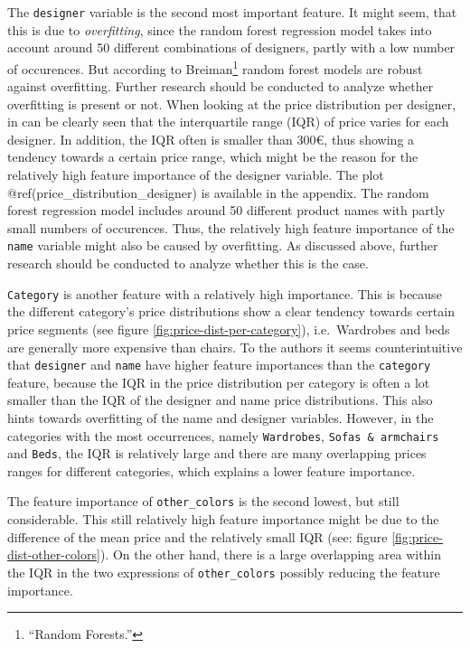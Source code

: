 \documentclass[a4paper, nobind]{templates/ociamthesis}
\begin{document}
The \texttt{designer} variable is the second most important feature. It might seem, that this is due to \emph{overfitting}, since the random forest regression model takes into account around 50 different combinations of designers, partly with a low number of occurences. But according to Breiman\footnote{``Random Forests.''} random forest models are robust against overfitting. Further research should be conducted to analyze whether overfitting is present or not.
When looking at the price distribution per designer, in can be clearly seen that the interquartile range (IQR) of price varies for each designer. In addition, the IQR often is smaller than 300€, thus showing a tendency towards a certain price range, which might be the reason for the relatively high feature importance of the designer variable. The plot @ref(price\_distribution\_designer) is available in the appendix.
The random forest regression model includes around 50 different product names with partly small numbers of occurences. Thus, the relatively high feature importance of the \texttt{name} variable might also be caused by overfitting. As discussed above, further research should be conducted to analyze whether this is the case.

\texttt{Category} is another feature with a relatively high importance. This is because the different category's price distributions show a clear tendency towards certain price segments (see figure \ref{fig:price-dist-per-category}), i.e.~Wardrobes and beds are generally more expensive than chairs.
To the authors it seems counterintuitive that \texttt{designer} and \texttt{name} have higher feature importances than the \texttt{category} feature, because the IQR in the price distribution per category is often a lot smaller than the IQR of the designer and name price distributions. This also hints towards overfitting of the name and designer variables. However, in the categories with the most occurrences, namely \texttt{Wardrobes}, \texttt{Sofas\ \&\ armchairs} and \texttt{Beds}, the IQR is relatively large and there are many overlapping prices ranges for different categories, which explains a lower feature importance.

The feature importance of \texttt{other\_colors} is the second lowest, but still considerable. This still relatively high feature importance might be due to the difference of the mean price and the relatively small IQR (see: figure \ref{fig:price-dist-other-colors}). On the other hand, there is a large overlapping area within the IQR in the two expressions of \texttt{other\_colors} possibly reducing the feature importance.
\end{document}
